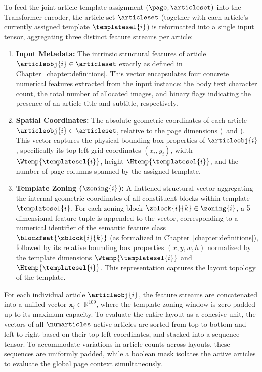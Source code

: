 To feed the joint article-template assignment $(\page, \articleset)$ into the Transformer encoder, the article set $\articleset$ (together with each article's currently assigned template $\templatesel{i}$) is reformatted into a single input tensor, aggregating three distinct feature streams per article:
\begin{enumerate}
    \item \textbf{Input Metadata:} The intrinsic structural features of article $\articleobj{i} \in \articleset$ exactly as defined in Chapter~\ref{chapter:definitions}. This vector encapsulates four concrete numerical features extracted from the input instance: the body text character count, the total number of allocated images, and binary flags indicating the presence of an article title and subtitle, respectively.
    
    \item \textbf{Spatial Coordinates:} The absolute geometric coordinates of each article $\articleobj{i} \in \articleset$, relative to the page dimensions (\Wpage\ and \Hpage). This vector captures the physical bounding box properties of $\articleobj{i}$, specifically its top-left grid coordinates $(x_i, y_i)$, width $\Wtemp{\templatesel{i}}$, height $\Htemp{\templatesel{i}}$, and the number of page columns spanned by the assigned template.
    
    \item \textbf{Template Zoning ($\zoning{i}$):} A flattened structural vector aggregating the internal geometric coordinates of all constituent blocks within template $\templatesel{i}$. For each zoning block $\zblock{i}{k} \in \zoning{i}$, a 5-dimensional feature tuple is appended to the vector, corresponding to a numerical identifier of the semantic feature class $\blockfeat{\zblock{i}{k}}$ (as formalized in Chapter~\ref{chapter:definitions}), followed by its relative bounding box properties $(x, y, w, h)$ normalized by the template dimensions $\Wtemp{\templatesel{i}}$ and $\Htemp{\templatesel{i}}$. This representation captures the layout topology of the template.


\end{enumerate}


For each individual article $\articleobj{i}$, the feature streams are concatenated into a unified vector $\mathbf{x}_i \in \mathbb{R}^{109}$, where the template zoning window is zero-padded up to its maximum  capacity. To evaluate the entire layout as a cohesive unit, the vectors of all $\numarticles$ active articles are sorted from top-to-bottom and left-to-right based on their top-left coordinates, and stacked into a sequence tensor. To accommodate variations in article counts across layouts, these sequences are uniformly padded, while a boolean mask isolates the active articles to evaluate the global page context simultaneously.

